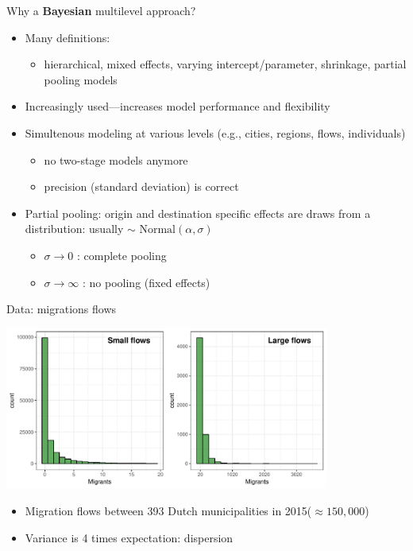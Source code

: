\documentclass{beamer}
\begin{document}
\begin{frame}{Why a \textbf{Bayesian} multilevel approach?}
\begin{itemize}
	 \item Many definitions:
	\begin{itemize}
		\item hierarchical, mixed effects, varying intercept/parameter, shrinkage, partial pooling models\pause
	\end{itemize}
	\item Increasingly used---increases model \alert{performance} and \alert{flexibility} \pause
    \item \alert{Simultenous} modeling at various levels (e.g., cities, regions, flows, individuals) 
    \begin{itemize}
    	\item no two-stage models anymore 
    	\item precision (standard deviation) is correct\pause
    \end{itemize}
	\item \alert{Partial pooling}: origin and destination specific effects are draws from a distribution: usually $\sim \text{ Normal}(\alpha, \sigma)$
	\begin{itemize}
		\item $\sigma \longrightarrow 0$ : complete pooling
		\item $\sigma \longrightarrow \infty$ : no pooling (fixed effects)
	\end{itemize}
\end{itemize}
\end{frame}

\begin{frame}{Data: migrations flows}
	\begin{center}
		\includegraphics[width=0.8\textwidth]{../fig/hist_mig}      
	\end{center}
\begin{itemize}
	\item Migration flows \alert{between} 393 Dutch municipalities in 2015($\approx 150,000$)
	\item Variance is 4 times expectation: \alert{dispersion}
\end{itemize}
\end{frame}
\end{document}
